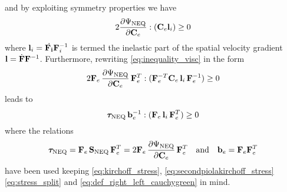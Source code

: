 and by exploiting symmetry properties we have
\begin{equation}
   2 \pdv{\Psi_{\text{NEQ}}}{\mathbf{C}_{e}}: ( \mathbf{C}_{e} \mathbf{l}_{i}) \geq 0     
   \label{eq:inequality_visc}
\end{equation}
where \(\mathbf{l}_{i} = \dot{\mathbf{F}_{i}}\mathbf{F}_{i}^{-1}\) is termed the inelastic part of the spatial velocity gradient \(\mathbf{l} = \dot{\mathbf{F}} \mathbf{F}^{-1}\). Furthermore, rewriting \cref{eq:inequality_visc} in the form
\begin{equation}
    2 \mathbf{F}_{e} \, \pdv{\Psi_{\text{NEQ}}}{\mathbf{C}_{e}}\, \mathbf{F}_{e}^{T} : (\mathbf{F}_{e}^{-T} \mathbf{C}_{e} \,\mathbf{l}_{i} \,\mathbf{F}_{e}^{-1}) \geq 0
\end{equation}
leads to 
\begin{equation}
    \bm{\tau}_{\text{NEQ}} \, \mathbf{b}_{e}^{-1} : (\mathbf{F}_{e} \, \mathbf{l}_{i} \, \mathbf{F}_{e}^{T}) \geq 0
    \label{eq:inequality_viscous}
\end{equation}
where the relations 
\begin{equation}
    \bm{\tau}_{\text{NEQ}} = \mathbf{F}_{e} \,\mathbf{S}_{\text{NEQ}} \, \mathbf{F}_{e}^{T} = 2 \mathbf{F}_{e} \, \pdv{\Psi_{\text{NEQ}}}{\mathbf{C}_{e}}\, \mathbf{F}_{e}^{T} 
    \quad \text{and} \quad
    \mathbf{b}_{e} = \mathbf{F}_{e} \mathbf{F}_{e}^{T}
\end{equation}
have been used keeping \cref{eq:kirchoff_stress}, \cref{eq:secondpiolakirchoff_stress} \cref{eq:stress_split} and \cref{eq:def_right_left_cauchygreen} in mind.

